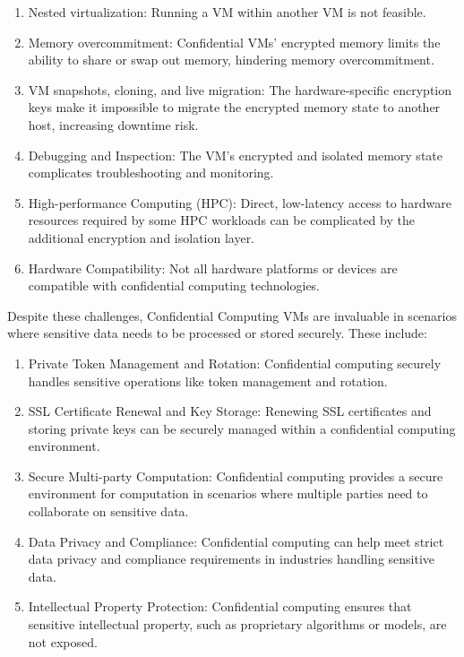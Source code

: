 \begin{enumerate}
    \item Nested virtualization: Running a VM within another VM is not feasible.
    \item Memory overcommitment: Confidential VMs' encrypted memory limits the ability to share or swap out memory, hindering memory overcommitment.
    \item VM snapshots, cloning, and live migration: The hardware-specific encryption keys make it impossible to migrate the encrypted memory state to another host, increasing downtime risk.
    \item Debugging and Inspection: The VM's encrypted and isolated memory state complicates troubleshooting and monitoring.
    \item High-performance Computing (HPC): Direct, low-latency access to hardware resources required by some HPC workloads can be complicated by the additional encryption and isolation layer.
    \item Hardware Compatibility: Not all hardware platforms or devices are compatible with confidential computing technologies.
\end{enumerate}

Despite these challenges, Confidential Computing VMs are invaluable in scenarios where sensitive data needs to be processed or stored securely. These include:

\begin{enumerate}
    \item Private Token Management and Rotation: Confidential computing securely handles sensitive operations like token management and rotation.
    \item SSL Certificate Renewal and Key Storage: Renewing SSL certificates and storing private keys can be securely managed within a confidential computing environment.
    \item Secure Multi-party Computation: Confidential computing provides a secure environment for computation in scenarios where multiple parties need to collaborate on sensitive data.
    \item Data Privacy and Compliance: Confidential computing can help meet strict data privacy and compliance requirements in industries handling sensitive data.
    \item Intellectual Property Protection: Confidential computing ensures that sensitive intellectual property, such as proprietary algorithms or models, are not exposed.
\end{enumerate}


